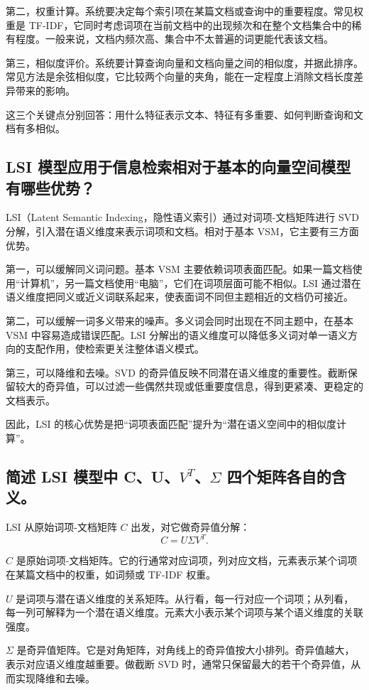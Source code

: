 第二，权重计算。系统要决定每个索引项在某篇文档或查询中的重要程度。常见权重是 TF-IDF，它同时考虑词项在当前文档中的出现频次和在整个文档集合中的稀有程度。一般来说，文档内频次高、集合中不太普遍的词更能代表该文档。

第三，相似度评价。系统要计算查询向量和文档向量之间的相似度，并据此排序。常见方法是余弦相似度，它比较两个向量的夹角，能在一定程度上消除文档长度差异带来的影响。

这三个关键点分别回答：用什么特征表示文本、特征有多重要、如何判断查询和文档有多相似。

\subsection{LSI 模型应用于信息检索相对于基本的向量空间模型有哪些优势？}

LSI（Latent Semantic Indexing，隐性语义索引）通过对词项-文档矩阵进行 SVD 分解，引入潜在语义维度来表示词项和文档。相对于基本 VSM，它主要有三方面优势。

第一，可以缓解同义词问题。基本 VSM 主要依赖词项表面匹配。如果一篇文档使用“计算机”，另一篇文档使用“电脑”，它们在词项层面可能不相似。LSI 通过潜在语义维度把同义或近义词联系起来，使表面词不同但主题相近的文档仍可接近。

第二，可以缓解一词多义带来的噪声。多义词会同时出现在不同主题中，在基本 VSM 中容易造成错误匹配。LSI 分解出的语义维度可以降低多义词对单一语义方向的支配作用，使检索更关注整体语义模式。

第三，可以降维和去噪。SVD 的奇异值反映不同潜在语义维度的重要性。截断保留较大的奇异值，可以过滤一些偶然共现或低重要度信息，得到更紧凑、更稳定的文档表示。

因此，LSI 的核心优势是把“词项表面匹配”提升为“潜在语义空间中的相似度计算”。

\subsection{简述 LSI 模型中 C、U、$V^T$、$\Sigma$ 四个矩阵各自的含义。}

LSI 从原始词项-文档矩阵 $C$ 出发，对它做奇异值分解：
\[
  C = U\Sigma V^T.
\]

$C$ 是原始词项-文档矩阵。它的行通常对应词项，列对应文档，元素表示某个词项在某篇文档中的权重，如词频或 TF-IDF 权重。

$U$ 是词项与潜在语义维度的关系矩阵。从行看，每一行对应一个词项；从列看，每一列可解释为一个潜在语义维度。元素大小表示某个词项与某个语义维度的关联强度。

$\Sigma$ 是奇异值矩阵。它是对角矩阵，对角线上的奇异值按大小排列。奇异值越大，表示对应语义维度越重要。做截断 SVD 时，通常只保留最大的若干个奇异值，从而实现降维和去噪。

